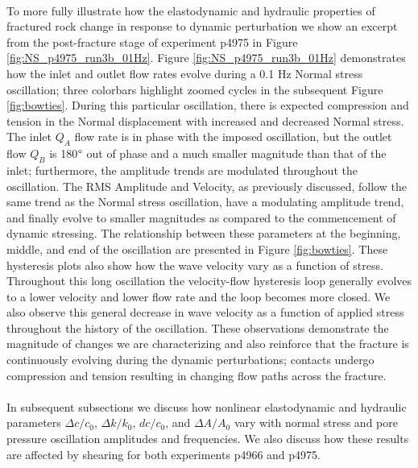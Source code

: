 \paragraph{}
To more fully illustrate how the elastodynamic and hydraulic properties of fractured rock change in response to dynamic perturbation we show an excerpt from the post-fracture stage of experiment p4975 in Figure \ref{fig:NS_p4975_run3b_01Hz}. 
Figure  \ref{fig:NS_p4975_run3b_01Hz} demonstrates how the inlet and outlet flow rates evolve during a 0.1 Hz Normal stress oscillation; three colorbars highlight zoomed cycles in the subsequent Figure \ref{fig:bowties}.  During this particular oscillation, there is expected compression and tension in the Normal displacement with increased and decreased Normal stress. The inlet $ Q_A $ flow rate is in phase with the imposed oscillation, but the outlet flow $ Q_B $ is 180$\degree$ out of phase and a much smaller magnitude than that of the inlet;  furthermore, the amplitude trends are modulated throughout the oscillation. The RMS Amplitude and Velocity, as previously discussed, follow the same trend as the Normal stress oscillation, have a modulating amplitude trend, and finally evolve to smaller magnitudes as compared to the commencement of dynamic stressing. 
The relationship between these parameters at the beginning, middle, and end of the oscillation are presented in Figure \ref{fig:bowties}. These hysteresis plots also show how the wave velocity vary as a function of stress. Throughout this long oscillation the velocity-flow hysteresis loop generally evolves to a lower velocity and lower flow rate and the loop becomes more closed. We also observe this general decrease in wave velocity as a function of applied stress throughout the history of the oscillation. These observations demonstrate the magnitude of changes we are characterizing and also reinforce that the fracture is continuously evolving during the dynamic perturbations; contacts undergo compression and tension resulting in changing flow paths across the fracture. 

\paragraph{}
In subsequent subsections we discuss how nonlinear elastodynamic and hydraulic parameters $\Delta c/c_0$, $ \Delta k/k_0 $, $dc/c_0$, and $\Delta A/A_0$ vary with normal stress and pore pressure oscillation amplitudes and frequencies. We also discuss how these results are affected by shearing for both experiments p4966 and p4975. 


